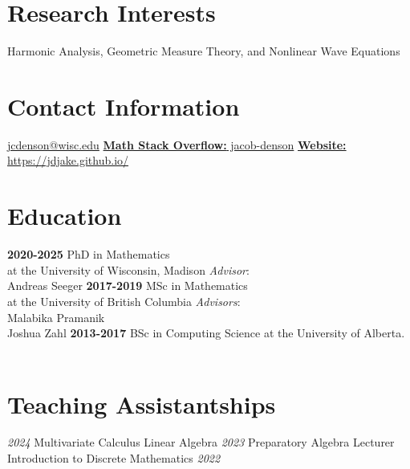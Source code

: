 \documentclass[a4paper]{cv-friggeri}
\begin{document}


\begin{aside} %
\section{Research Interests}
Harmonic Analysis, Geometric Measure Theory, and Nonlinear Wave Equations
~
\vspace{-1.3em}\section{Contact Information}
\href{mailto:jcdenson@wisc.edu}{jcdenson@wisc.edu}
\href{https://math.stackexchange.com/users/120724/jacob-denson}{{\bf Math Stack Overflow:} jacob-denson}
\href{https://jdjake.github.io/}{{\bf Website:} https://jdjake.github.io/}
~
\vspace{-1.3em}\section{Education}
{\bf 2020-2025}
PhD in Mathematics\\
at the University of Wisconsin, Madison
\emph{Advisor}:\\Andreas Seeger
{\bf 2017-2019}
{MSc in Mathematics}\\
at the University of British Columbia
\emph{Advisors}:\\Malabika Pramanik\\Joshua Zahl
{\bf 2013-2017}
BSc in Computing Science at the University of Alberta.
~
\vspace{-1.3em}\section{Teaching Assistantships}
\emph{2024}
Multivariate Calculus
\vspace{0.2em}Linear Algebra
\vspace{0.5em}\emph{2023}
Preparatory Algebra Lecturer
\vspace{0.2em}Introduction to Discrete Mathematics
\vspace{0.5em}\emph{2022}

\end{aside}
\end{document}
